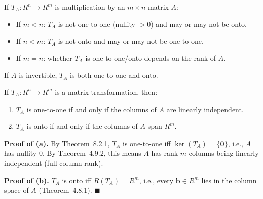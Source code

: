 \documentclass{article}
\begin{document}
If $T_A : R^n \to R^m$ is multiplication by an $m\times n$ matrix $A$:
\begin{itemize}
  \item If $m < n$: $T_A$ is not one-to-one (nullity $> 0$) and may or may not be onto.
  \item If $n < m$: $T_A$ is not onto and may or may not be one-to-one.
  \item If $m = n$: whether $T_A$ is one-to-one/onto depends on the rank of $A$.
\end{itemize}
If $A$ is invertible, $T_A$ is both one-to-one and onto.

\begin{tcolorbox}[colback=red!4, colframe=red!60!black,
  title={\textbf{Theorem 8.2.3}}, boxrule=0.5mm, arc=3mm]
If $T_A : R^n \to R^m$ is a matrix transformation, then:
\begin{enumerate}
  \item[(a)] $T_A$ is one-to-one if and only if the columns of $A$ are linearly independent.
  \item[(b)] $T_A$ is onto if and only if the columns of $A$ span $R^m$.
\end{enumerate}
\end{tcolorbox}

\textbf{Proof of (a).} By Theorem~8.2.1, $T_A$ is one-to-one iff $\ker(T_A) = \{\mathbf{0}\}$,
i.e., $A$ has nullity 0. By Theorem~4.9.2, this means $A$ has rank $m$ columns being
linearly independent (full column rank).

\textbf{Proof of (b).} $T_A$ is onto iff $R(T_A) = R^m$, i.e., every $\mathbf{b} \in R^m$
lies in the column space of $A$ (Theorem~4.8.1). $\blacksquare$
\end{document}
